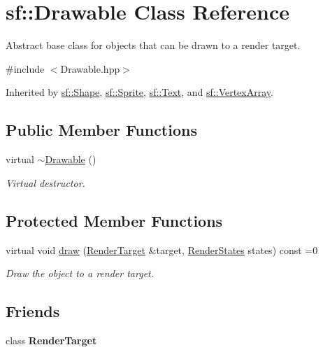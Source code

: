 \hypertarget{classsf_1_1_drawable}{\section{sf\+:\+:Drawable Class Reference}
\label{classsf_1_1_drawable}
}


Abstract base class for objects that can be drawn to a render target.  




{\ttfamily \#include $<$Drawable.\+hpp$>$}



Inherited by \hyperlink{classsf_1_1_shape}{sf\+::\+Shape}, \hyperlink{classsf_1_1_sprite}{sf\+::\+Sprite}, \hyperlink{classsf_1_1_text}{sf\+::\+Text}, and \hyperlink{classsf_1_1_vertex_array}{sf\+::\+Vertex\+Array}.

\subsection*{Public Member Functions}
\begin{DoxyCompactItemize}
\item 
\hypertarget{classsf_1_1_drawable_a906002f2df7beb5edbddf5bbef96f120}{virtual \hyperlink{classsf_1_1_drawable_a906002f2df7beb5edbddf5bbef96f120}{$\sim$\+Drawable} ()}\label{classsf_1_1_drawable_a906002f2df7beb5edbddf5bbef96f120}

\begin{DoxyCompactList}\small\item\em Virtual destructor. \end{DoxyCompactList}\end{DoxyCompactItemize}
\subsection*{Protected Member Functions}
\begin{DoxyCompactItemize}
\item 
virtual void \hyperlink{classsf_1_1_drawable_a90d2c88bba9b035a0844eccb380ef631}{draw} (\hyperlink{classsf_1_1_render_target}{Render\+Target} \&target, \hyperlink{classsf_1_1_render_states}{Render\+States} states) const =0
\begin{DoxyCompactList}\small\item\em Draw the object to a render target. \end{DoxyCompactList}\end{DoxyCompactItemize}
\subsection*{Friends}
\begin{DoxyCompactItemize}
\item 
\hypertarget{classsf_1_1_drawable_aa5afc6f82b7b587ed5ada4d227ce32aa}{class {\bfseries Render\+Target}}\label{classsf_1_1_drawable_aa5afc6f82b7b587ed5ada4d227ce32aa}

\end{DoxyCompactItemize}


